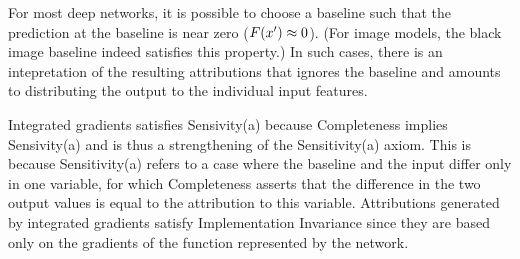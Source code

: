 For most deep networks, it is possible to choose a baseline such that
the prediction at the baseline is near zero ($F(x') \approx
0$). (For image models, the black image baseline indeed satisfies
this property.) In such cases, there is an intepretation of the resulting
attributions that ignores the baseline and amounts to distributing the
output to the individual input features.

\begin{remark}\label{rem:compsens}
  Integrated gradients satisfies Sensivity(a) because Completeness implies
Sensivity(a) and is thus a strengthening of the Sensitivity(a) axiom. This
is because Sensitivity(a) refers to a case where the baseline and the input
differ only in one variable, for which Completeness asserts that the difference
in the two output values is equal to the attribution to this variable.
Attributions generated by integrated gradients satisfy Implementation Invariance
since they are based only on the gradients of the function represented
by the network.
\end{remark}





















